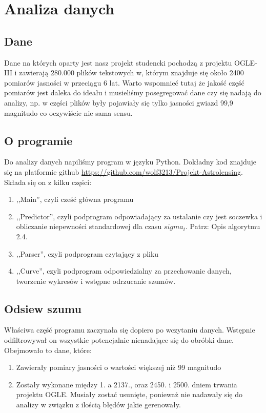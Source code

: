 \documentclass[a4paper,11pt]{article}
\newcommand{\ak}{\hspace{0.7 cm}}
\begin{document}
\section{Analiza danych}
\subsection{Dane}
\ak Dane na których oparty jest nasz projekt studencki pochodzą z projektu OGLE-III i zawierają 280.000 plików tekstowych w, którym znajduje się około 2400 pomiarów jasności w przeciągu 6 lat. Warto wspomnieć tutaj że jakość część pomiarów jest daleka do ideału i musieliśmy posegregować dane czy się nadają do analizy, np. w części plików były pojawiały się tylko jasności gwiazd 99,9 magnitudo co oczywiście nie sama sensu.
\subsection{O programie}
\ak Do analizy danych napiliśmy program w języku Python. Dokładny kod znajduje się na platformie github \url{https://github.com/wolf3213/Projekt-Astrolensing}. Składa się on z kilku części:
\begin{enumerate}
\item ,,Main'', czyli cześć główna programu
\item ,,Predictor'', czyli podprogram odpowiadający za ustalanie czy jest soczewka i obliczanie niepewności standardowej dla czasu $sigma_t$. Patrz: Opis algorytmu 2.4.
\item ,,Parser'', czyli podprogram czytający z pliku
\item ,,Curve'', czyli podprogram odpowiedzialny za przechowanie danych, tworzenie wykresów i wstępne odrzucanie szumów.
\end{enumerate} 
\subsection{Odsiew szumu}
\ak Właściwa część programu zaczynała się dopiero po wczytaniu danych. Wstępnie odfiltrowywał on wszystkie potencjalnie nienadające się do obróbki dane. Obejmowało to dane, które:
\begin{enumerate}
\item Zawierały pomiary jasności o wartości większej niż 99 magnitudo 
\item Zostały wykonane między 1. a 2137., oraz  2450. i 2500. dniem trwania projektu OGLE. Musiały zostać usunięte, ponieważ nie nadawały się do analizy w związku z ilością błędów jakie gerenowały.
\end{enumerate}
\end{document}
